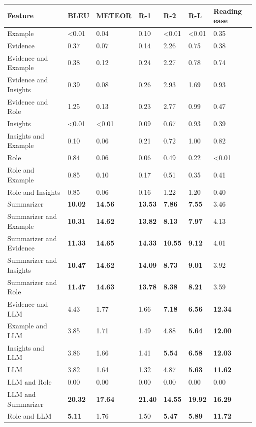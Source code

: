 \begin{tabular}{|l|l|l|l|l|l|l|}
\hline
\textbf{Feature} & BLEU & METEOR & R-1 & R-2 & R-L & Reading ease \\
 \hline
 Example & \textless{}0.01 & 0.04 & 0.10 & \textless{}0.01 & \textless{}0.01 & 0.35 \\
 \hline
 Evidence & 0.37 & 0.07 & 0.14 & 2.26 & 0.75 & 0.38 \\
 \hline
 Evidence and Example & 0.38 & 0.12 & 0.24 & 2.27 & 0.78 & 0.74 \\
 \hline
 Evidence and Insights & 0.39 & 0.08 & 0.26 & 2.93 & 1.69 & 0.93 \\
 \hline
 Evidence and Role & 1.25 & 0.13 & 0.23 & 2.77 & 0.99 & 0.47 \\
 \hline
 Insights & \textless{}0.01 & \textless{}0.01 & 0.09 & 0.67 & 0.93 & 0.39 \\
 \hline
 Insights and Example & 0.10 & 0.06 & 0.21 & 0.72 & 1.00 & 0.82 \\
 \hline
 Role & 0.84 & 0.06 & 0.06 & 0.49 & 0.22 & \textless{}0.01 \\
 \hline
 Role and Example & 0.85 & 0.10 & 0.17 & 0.51 & 0.35 & 0.41 \\
 \hline
 Role and Insights & 0.85 & 0.06 & 0.16 & 1.22 & 1.20 & 0.40 \\
 \hline
 Summarizer & \textbf{10.02} & \textbf{14.56} & \textbf{13.53} & \textbf{7.86} & \textbf{7.55} & 3.46 \\
 \hline
 Summarizer and Example & \textbf{10.31} & \textbf{14.62} & \textbf{13.82} & \textbf{8.13} & \textbf{7.97} & 4.13 \\
 \hline
 Summarizer and Evidence & \textbf{11.33} & \textbf{14.65} & \textbf{14.33} & \textbf{10.55} & \textbf{9.12} & 4.01 \\
 \hline
 Summarizer and Insights & \textbf{10.47} & \textbf{14.62} & \textbf{14.09} & \textbf{8.73} & \textbf{9.01} & 3.92 \\
 \hline
 Summarizer and Role & \textbf{11.47} & \textbf{14.63} & \textbf{13.78} & \textbf{8.38} & \textbf{8.21} & 3.59 \\
 \hline
 Evidence and LLM & 4.43 & 1.77 & 1.66 & \textbf{7.18} & \textbf{6.56} & \textbf{12.34} \\
 \hline
 Example and LLM & 3.85 & 1.71 & 1.49 & 4.88 & \textbf{5.64} & \textbf{12.00} \\
 \hline
 Insights and LLM & 3.86 & 1.66 & 1.41 & \textbf{5.54} & \textbf{6.58} & \textbf{12.03} \\
 \hline
 LLM & 3.82 & 1.64 & 1.32 & 4.87 & \textbf{5.63} & \textbf{11.62} \\
 \hline
 LLM and Role & 0.00 & 0.00 & 0.00 & 0.00 & 0.00 & 0.00 \\
 \hline
 LLM and Summarizer & \textbf{20.32} & \textbf{17.64} & \textbf{21.40} & \textbf{14.55} & \textbf{19.92} & \textbf{16.29} \\
 \hline
 Role and LLM & \textbf{5.11} & 1.76 & 1.50 & \textbf{5.47} & \textbf{5.89} & \textbf{11.72} \\
\hline
\end{tabular}

